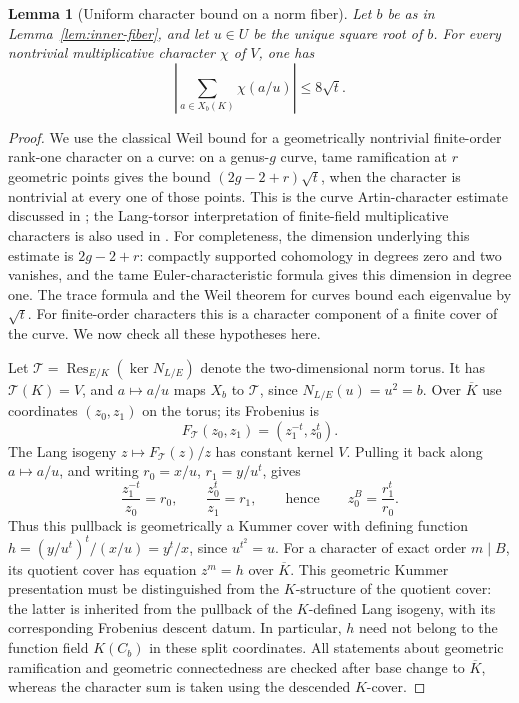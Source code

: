 \documentclass[11pt]{article}
\newtheorem{lemma}[theorem]{Lemma}
\begin{document}
\begin{lemma}[Uniform character bound on a norm fiber]
\label{lem:inner-character}
Let $b$ be as in Lemma~\ref{lem:inner-fiber}, and let $u\in U$ be
the unique square root of $b$. For every nontrivial multiplicative
character $\chi$ of $V$, one has
\begin{equation}\label{eq:inner-character}
 \left|\sum_{a\in X_b(K)}\chi(a/u)\right|\le8\sqrt t.
\end{equation}
\end{lemma}
\begin{proof}
We use the classical Weil bound for a geometrically nontrivial
finite-order rank-one character on a curve: on a genus-$g$ curve,
tame ramification at $r$ geometric points gives the bound
$(2g-2+r)\sqrt t$, when the character is nontrivial at every one
of those points. This is the curve Artin-character estimate
discussed in \cite[\S4]{FFSTV13}; the Lang-torsor interpretation
of finite-field multiplicative characters is also used in \cite{Katz89}.
For completeness, the dimension underlying this estimate is
$2g-2+r$: compactly supported cohomology in degrees zero and two
vanishes, and the tame Euler-characteristic formula gives this
dimension in degree one. The trace formula and the Weil theorem
for curves bound each eigenvalue by $\sqrt t$.
For finite-order characters this is a character component of a
finite cover of the curve. We now check all these hypotheses here.

Let $\mathcal T=\operatorname{Res}_{E/K}
(\ker N_{L/E})$ denote the two-dimensional norm torus.
It has $\mathcal T(K)=V$, and $a\mapsto a/u$ maps $X_b$ to
$\mathcal T$, since $N_{L/E}(u)=u^2=b$.
Over $\overline K$ use coordinates $(z_0,z_1)$ on the torus;
its Frobenius is
\[
 F_{\mathcal T}(z_0,z_1)=(z_1^{-t},z_0^t).
\]
The Lang isogeny $z\mapsto F_{\mathcal T}(z)/z$ has constant
kernel $V$. Pulling it back along $a\mapsto a/u$, and writing
$r_0=x/u$, $r_1=y/u^t$, gives
\[
 \frac{z_1^{-t}}{z_0}=r_0,\qquad
 \frac{z_0^t}{z_1}=r_1,
 \qquad\text{hence}\qquad
 z_0^B=\frac{r_1^t}{r_0}.
\]
Thus this pullback is geometrically a Kummer cover with defining
function $h=(y/u^t)^t/(x/u)=y^t/x$, since $u^{t^2}=u$.
For a character of exact order $m\mid B$, its quotient cover has
equation $z^m=h$ over $\overline K$.
This geometric Kummer presentation must be distinguished from the
$K$-structure of the quotient cover: the latter is inherited from
the pullback of the $K$-defined Lang isogeny, with its corresponding
Frobenius descent datum. In particular, $h$ need not belong to the
function field $K(C_b)$ in these split coordinates. All statements
about geometric ramification and geometric connectedness are checked
after base change to $\overline K$, whereas the character sum is
taken using the descended $K$-cover.


\end{proof}
\end{document}
